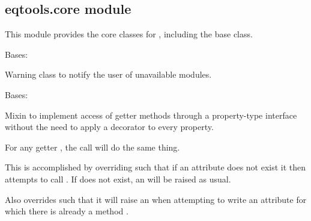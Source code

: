 \documentclass[letterpaper,10pt,english]{sphinxmanual}
\begin{document}
\subsection{eqtools.core module}
\label{\detokenize{eqtools:module-eqtools.core}}\label{\detokenize{eqtools:eqtools-core-module}}
This module provides the core classes for {\hyperref[\detokenize{eqtools:module-eqtools}]{}}, including the
base {\hyperref[\detokenize{eqtools:eqtools.core.Equilibrium}]{}} class.

\begin{fulllineitems}
\label{\detokenize{eqtools:eqtools.core.ModuleWarning}}
Bases: 

Warning class to notify the user of unavailable modules.

\end{fulllineitems}


\begin{fulllineitems}
\label{\detokenize{eqtools:eqtools.core.PropertyAccessMixin}}
Bases: 

Mixin to implement access of getter methods through a property-type
interface without the need to apply a decorator to every property.

For any getter , the call  will do the
same thing.

This is accomplished by overriding  such that if
an attribute  does not exist it then attempts to call .
If  does not exist, an  will be
raised as usual.

Also overrides  such that it will raise an
 when attempting to write an attribute  for
which there is already a method .

\end{fulllineitems}
\end{document}
